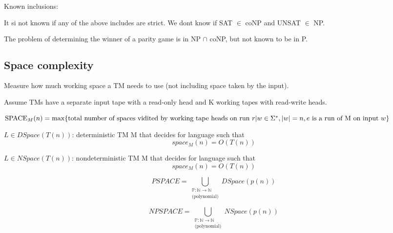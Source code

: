 \documentclass[a4paper,12pt]{article}
\theoremstyle{definition}
\theoremstyle{remark}
\newcommand{\N}{\mathbb{N}}
\newcommand{\Pp}{\mathbb{P}}
\begin{document}
Known inclusions:


It si not known if any of the above includes are strict. We dont know if SAT $\in$ coNP and UNSAT $\in$ NP.

The problem of determining the winner of a parity game is in NP $\cap$ coNP, but not known to be in P.

\subsection{Space complexity}

Measure how much working space a TM needs to use (not including space taken by the input).

Assume TMs have a separate input tape with a read-only head and K working tapes with read-write heads.

$\text{SPACE}_M(n) = \max\{ \text{total number of spaces vidited by working tape heads on run } r | \\ 
w \in \Sigma^*, |w| = n, e \text{ is a run of M on input } w\}$

$L \in DSpace(T(n))$: deterministic TM M that decides for language such that 
\begin{equation*}
    space_M (n) = O(T(n))
\end{equation*}

$L \in NSpace(T(n))$: nondeterministic TM M that decides for language such that
\begin{equation*}
    space_M (n) = O(T(n))
\end{equation*}

\begin{equation*}
    PSPACE = \bigcup_{\substack{\Pp: \N \to \N \\ \text{(polynomial)}}} DSpace(p(n))
\end{equation*}

\begin{equation*}
    NPSPACE = \bigcup_{\substack{\Pp: \N \to \N \\ \text{(polynomial)}}} NSpace(p(n))
\end{equation*}
\end{document}
